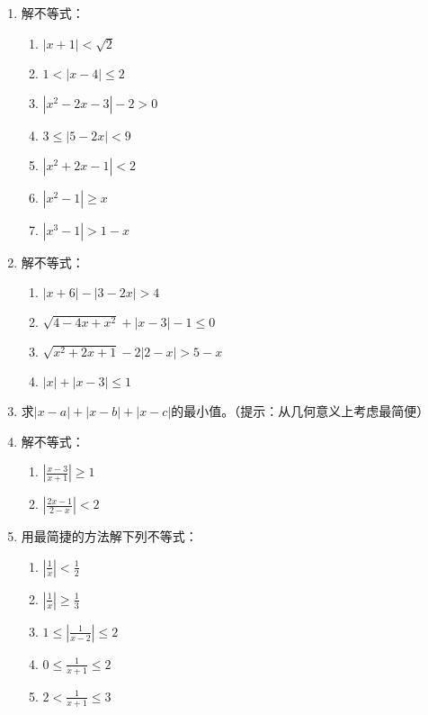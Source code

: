 \begin{enumerate}
    \item 解不等式：
\begin{multicols}{2}
\begin{enumerate}[(1)]
    \item $|x+1|<\sqrt{2}$
    \item $1<|x-4|\leqslant2$
    \item $| x^{2}-2x-3|-2>0$
    \item $3\leqslant|5-2x|<9$
    \item $|x^{2}+2x-1|<2$
    \item $|x^{2}-1|\geqslant x$
    \item $|x^{3}-1|>1-x$
\end{enumerate}
\end{multicols}

\item 解不等式：
\begin{multicols}{2}
\begin{enumerate}[(1)]
    \item $|x+6|-|3-2x|>4$
    \item $\sqrt{4-4x+x^{2}}+|x-3|-1\leq0$
    \item $\sqrt{x^{2}+2x+1}-2|2-x|>5-x$
    \item $|x|+|x-3|\leqslant1$
\end{enumerate}
\end{multicols}

\item 求$|x-a|+|x-b|+|x-c|$的最小值。（提示：从几何意义上考虑最简便）

\item 解不等式：
\begin{multicols}{2}
\begin{enumerate}[(1)]
    \item $\left|\frac{x-3}{x+1}\right|\ge 1$
    \item $\left|\frac{2x-1}{2-x}\right|<2$
\end{enumerate}
\end{multicols}

\item 用最简捷的方法解下列不等式：
\begin{multicols}{3}
\begin{enumerate}[(1)]
    \item $\left|\frac{1}{x}\right|<\frac{1}{2}$
    \item $\left|\frac{1}{x}\right|\ge \frac{1}{3}$
    \item    $1\le \left|\frac{1}{x-2}\right|\le 2$
    \item $0\le \frac{1}{x+1}\le 2$
    \item $2<\frac{1}{x+1}\le 3$
\end{enumerate}
\end{multicols}
\end{enumerate}


